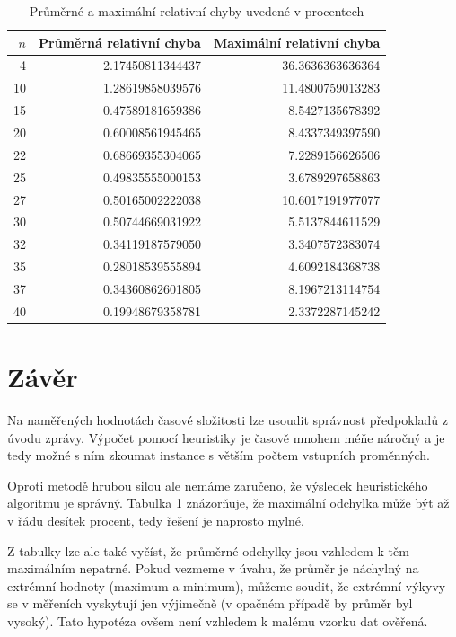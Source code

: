 \documentclass{article}
\begin{document}
\begin{table}
\centering
    \begin{tabular}{ |r||r|r| } 
        \hline
        $n$ & Průměrná relativní chyba & Maximální relativní chyba \\
        \hline
        \hline
         4 & 2.17450811344437 & 36.3636363636364 \\
        10 & 1.28619858039576 & 11.4800759013283 \\
        15 & 0.47589181659386 &  8.5427135678392 \\
        20 & 0.60008561945465 &  8.4337349397590 \\
        22 & 0.68669355304065 &  7.2289156626506 \\
        25 & 0.49835555000153 &  3.6789297658863 \\
        27 & 0.50165002222038 & 10.6017191977077 \\
        30 & 0.50744669031922 &  5.5137844611529 \\
        32 & 0.34119187579050 &  3.3407572383074 \\
        35 & 0.28018539555894 &  4.6092184368738 \\
        37 & 0.34360862601805 &  8.1967213114754 \\
        40 & 0.19948679358781 &  2.3372287145242 \\
        \hline
    \end{tabular}
\caption{Průměrné a maximální relativní chyby uvedené v procentech} \label{tab:approximation-error}
\end{table}


\section{Závěr}

Na naměřených hodnotách časové složitosti lze usoudit správnost předpokladů z úvodu zprávy.
Výpočet pomocí heuristiky je časově mnohem méňe náročný a je tedy možné s ním zkoumat instance s větším počtem vstupních proměnných.

Oproti metodě hrubou silou ale nemáme zaručeno, že výsledek heuristického algoritmu je správný.
Tabulka \ref{tab:approximation-error} znázorňuje, že maximální odchylka může být až v řádu desítek procent, tedy řešení je naprosto mylné.

Z tabulky lze ale také vyčíst, že průměrné odchylky jsou vzhledem k těm maximálním nepatrné.
Pokud vezmeme v úvahu, že průměr je náchylný na extrémní hodnoty (maximum a minimum), můžeme soudit, že extrémní výkyvy se v měřeních vyskytují jen výjimečně (v opačném případě by průměr byl vysoký).
Tato hypotéza ovšem není vzhledem k malému vzorku dat ověřená.



\end{document}

